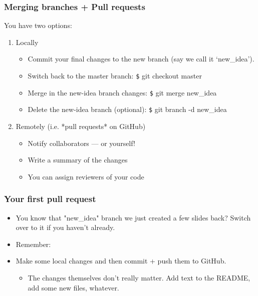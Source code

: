 \documentclass[
  shownotes,
  xcolor={svgnames},
  hyperref={colorlinks,citecolor=DarkBlue,linkcolor=DarkRed,urlcolor=DarkBlue}
  ]{beamer}
\newenvironment{Shaded}{\begin{snugshade}}{\end{snugshade}}
\newcommand{\FunctionTok}[1]{\textcolor[rgb]{0.00,0.00,0.00}{#1}}
\newcommand{\NormalTok}[1]{#1}
\begin{document}
\begin{frame}[fragile]
\frametitle{Merging branches + Pull requests}

You have two options:

\begin{enumerate}
\item Locally
\begin{itemize}
  \item Commit your final changes to the new branch (say we call it `new\_idea').
  \item Switch back to the master branch: {\texttt \$ git checkout master}
  \item Merge in the new-idea branch changes: {\texttt \$ git merge new\_idea}
  \item Delete the new-idea branch (optional): {\texttt \$ git branch -d new\_idea}
\end{itemize}



  
  \bigskip
  \item  Remotely (i.e. *pull requests* on GitHub)
  \begin{itemize}

  \item Notify collaborators — or yourself! 
  \item Write a summary of  the changes
  \item You can assign reviewers of your code 
  \end{itemize}



\end{enumerate}



\end{frame}

\begin{frame}[fragile]
\frametitle{Your first pull request}

\begin{itemize}
\item You know that "new\_idea" branch we just created a few slides back? Switch over to it if you haven't already.
\bigskip
\item Remember: 

  \begin{Shaded}
\end{Shaded}


\bigskip
\item Make some local changes and then commit + push them to GitHub.
  \medskip
  \begin{itemize}
    \item The changes themselves don't really matter. Add text to the README, add some new files, whatever.
  \end{itemize}

\end{itemize}

\end{frame}
\end{document}
